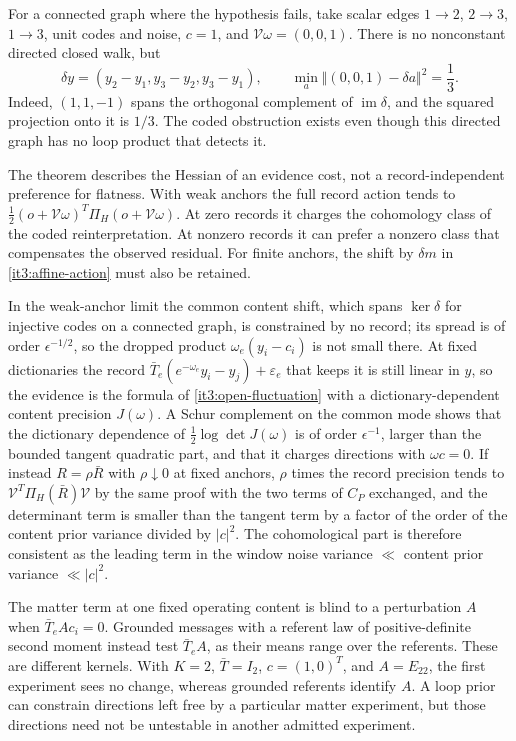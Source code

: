 \documentclass[11pt,letterpaper]{report}
\begin{document}
For a connected graph where the hypothesis fails, take scalar edges $1\to2$, $2\to3$, $1\to3$, unit codes and noise, $c=1$, and $\mathcal V\omega=(0,0,1)$. There is no nonconstant directed closed walk, but
\begin{equation}
\delta y=(y_2-y_1,y_3-y_2,y_3-y_1),\qquad
\min_a\Vert(0,0,1)-\delta a\Vert^2=\frac13.
\label{it3:dag-example}
\end{equation}
Indeed, $(1,1,-1)$ spans the orthogonal complement of $\operatorname{im}\delta$, and the squared projection onto it is $1/3$. The coded obstruction exists even though this directed graph has no loop product that detects it.

The theorem describes the Hessian of an evidence cost, not a record-independent preference for flatness. With weak anchors the full record action tends to
$\frac12(o+\mathcal V\omega)^T\Pi_H(o+\mathcal V\omega)$.
At zero records it charges the cohomology class of the coded reinterpretation. At nonzero records it can prefer a nonzero class that compensates the observed residual. For finite anchors, the shift by $\delta m$ in \cref{it3:affine-action} must also be retained.

In the weak-anchor limit the common content shift, which spans $\ker\delta$ for injective codes on a connected graph, is constrained by no record; its spread is of order $\epsilon^{-1/2}$, so the dropped product $\omega_e(y_i-c_i)$ is not small there. At fixed dictionaries the record $\bar T_e(e^{-\omega_e}y_i-y_j)+\varepsilon_e$ that keeps it is still linear in $y$, so the evidence is the formula of \cref{it3:open-fluctuation} with a dictionary-dependent content precision $J(\omega)$. A Schur complement on the common mode shows that the dictionary dependence of $\frac12\log\det J(\omega)$ is of order $\epsilon^{-1}$, larger than the bounded tangent quadratic part, and that it charges directions with $\omega c=0$. If instead $R=\rho\bar R$ with $\rho\downarrow0$ at fixed anchors, $\rho$ times the record precision tends to $\mathcal V^T\Pi_H(\bar R)\mathcal V$ by the same proof with the two terms of $C_P$ exchanged, and the determinant term is smaller than the tangent term by a factor of the order of the content prior variance divided by $|c|^2$. The cohomological part is therefore consistent as the leading term in the window noise variance $\ll$ content prior variance $\ll|c|^2$.

The matter term at one fixed operating content is blind to a perturbation $A$ when $\bar T_eAc_i=0$. Grounded messages with a referent law of positive-definite second moment instead test $\bar T_eA$, as their means range over the referents. These are different kernels. With $K=2$, $\bar T=I_2$, $c=(1,0)^T$, and $A=E_{22}$, the first experiment sees no change, whereas grounded referents identify $A$. A loop prior can constrain directions left free by a particular matter experiment, but those directions need not be untestable in another admitted experiment.
\end{document}
